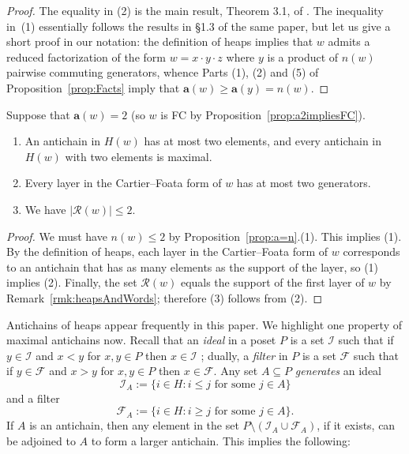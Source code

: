 \documentclass[ALCO,Unicode,published]{cedram}
\newcommand{\cali}{\mathcal{I}}
\newcommand{\calf}{\mathcal{F}}
\newcommand{\calr}{\mathcal{R}}
\newcommand{\la}{\mathbf{a}}
\newcommand{\se}{\subseteq}
\newcommand{\abs}[1]{\lvert #1 \rvert}
\begin{document}
\begin{proof}
    The equality in (2) is the main result, Theorem 3.1, of \cite{Shi}. The inequality in~(1) essentially follows
    the results in \S 1.3 of the same paper, but let us give a short proof in our notation: the definition of
    heaps implies that $w$ admits a reduced factorization of the form $w=x\cdot y\cdot z$ where $y$ is a product of
    $n(w)$ pairwise commuting generators, whence Parts (1), (2) and (5) of Proposition~\ref{prop:Facts} imply that
    $\la(w)\ge\la(y)=n(w)$.  
\end{proof}

\begin{corollary}
    \label{coro:layerSizeBound}
    Suppose that $\la(w)=2$ \textup{(}so $w$ is FC by Proposition~\ref{prop:a2impliesFC}\textup{)}. 
    \begin{enumerate}
        \item An antichain in $H(w)$ has at most two elements,  and every antichain in $H(w)$ with two elements is
             maximal.
        \item Every layer in the Cartier--Foata form of $w$ has at most two generators.
        \item We have $\abs{\calr(w)}\le 2$.
    \end{enumerate}
\end{corollary}
\begin{proof} 
    We must have $n(w)\le 2$ by Proposition~\ref{prop:a=n}.(1). This implies (1). By the definition of heaps, each layer in
    the Cartier--Foata form of $w$ corresponds to an antichain that has as many elements as the support of the
    layer, so (1) implies (2). Finally, the set $\calr(w)$ equals the
    support of the first layer of $w$ by Remark~\ref{rmk:heapsAndWords}; therefore (3) follows from (2).
\end{proof}

Antichains of heaps appear frequently in this paper. We highlight one property of maximal antichains now. Recall
that an \emph{ideal} in a poset $P$ is a set $\cali$ such that if $y\in \cali$ and $x<y$ for $x,y\in P$ then $x\in
\cali$ ; dually, a \emph{filter} in $P$ is a set $\calf$ such that if $y\in \calf$ and $x>y$ for $x,y\in P$ then
$x\in \calf$. Any set $A\se P$ \emph{generates} an ideal 
\[ \cali_A:=\{i\in H:i\le j\text{ for some $j\in A$}\} \]
and a filter 
\[ \calf_A:=\{i\in H:i\ge j\text{ for some $j\in A$}\}.\] 
If $A$ is an antichain, then any element in the set $P\setminus (\cali_A\cup\calf_A)$, if it exists, can be
adjoined to $A$ to form a larger antichain. This implies the following:
\end{document}
